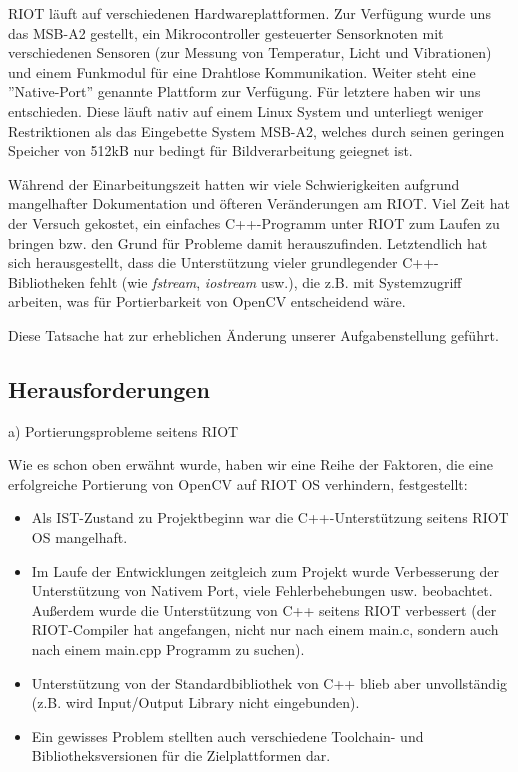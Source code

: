 \documentclass[10pt,a4paper]{article}
\begin{document}
RIOT läuft auf verschiedenen Hardwareplattformen. Zur Verfügung wurde uns das MSB-A2 gestellt, ein Mikrocontroller gesteuerter Sensorknoten mit verschiedenen Sensoren (zur Messung von Temperatur, Licht und Vibrationen) und einem Funkmodul für eine Drahtlose Kommunikation. Weiter steht eine ''Native-Port'' genannte Plattform zur Verfügung. Für letztere haben wir uns entschieden. Diese läuft nativ auf einem Linux System und unterliegt weniger Restriktionen als das Eingebette System MSB-A2, welches durch seinen geringen Speicher von 512kB nur bedingt für Bildverarbeitung geiegnet ist. \newline

Während der Einarbeitungszeit hatten wir viele Schwierigkeiten aufgrund mangelhafter Dokumentation und öfteren Veränderungen am RIOT. Viel Zeit hat der Versuch gekostet, ein einfaches C++-Programm unter RIOT zum Laufen zu bringen bzw. den Grund für Probleme damit herauszufinden. Letztendlich hat sich herausgestellt, dass die Unterstützung vieler grundlegender C++-Bibliotheken fehlt (wie {\it fstream}, {\it iostream} usw.), die z.B. mit Systemzugriff arbeiten, was für Portierbarkeit von OpenCV entscheidend wäre. \newline

Diese Tatsache hat zur erheblichen Änderung unserer Aufgabenstellung geführt.

\subsection{Herausforderungen}

a) Portierungsprobleme seitens RIOT \newline

Wie es schon oben erwähnt wurde, haben wir eine Reihe der Faktoren, die eine erfolgreiche Portierung von OpenCV auf RIOT OS verhindern, festgestellt:

\begin{itemize}
\item Als IST-Zustand zu Projektbeginn war die C++-Unterstützung seitens RIOT OS mangelhaft.
\item Im Laufe der Entwicklungen zeitgleich zum Projekt wurde Verbesserung der Unterstützung von Nativem Port, viele Fehlerbehebungen usw. beobachtet. Außerdem wurde die Unterstützung von C++ seitens RIOT verbessert (der RIOT-Compiler hat angefangen, nicht nur nach einem main.c, sondern auch nach einem main.cpp Programm zu suchen). 
\item Unterstützung von der Standardbibliothek von C++ blieb aber unvollständig (z.B. wird Input/Output Library nicht eingebunden).
\item Ein gewisses Problem stellten auch verschiedene Toolchain- und Bibliotheksversionen für die Zielplattformen dar.
\end{itemize}
\end{document}
